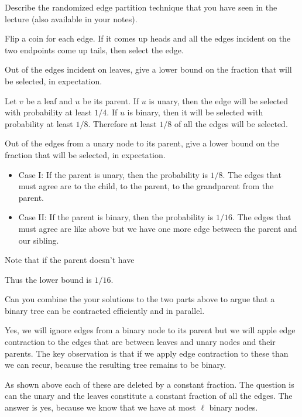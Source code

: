 \begin{problem}
\ask[2.]
Describe the randomized edge partition technique that you have seen in
the lecture (also available in your notes). 

\sol
Flip a coin for each edge. If it comes up heads and all the edges
incident on the two endpoints come up tails, then select the edge.


\ask[5.]
Out of the edges incident on leaves, give a lower bound on the
fraction that will be selected, in expectation.

\sol
Let $v$ be a leaf and $u$ be its parent. If $u$ is unary, then the
edge will be selected with probability at least $1/4$.  If $u$ is
binary, then it will be selected with probability at least $1/8$.
Therefore at least $1/8$ of all the edges will be selected.




\ask[5.]
Out of the edges from a unary node to its parent, give a lower bound
on the fraction that will be selected, in expectation.

\sol
\begin{itemize}
\item Case I: If the parent is unary, then the probability is $1/8$.
The edges that must agree are to the child, to the parent, to the
grandparent from the parent.
\item Case II: If the parent is binary, then the probability is
$1/16$. The edges that must agree are like above but we have one more
edge between the parent and our sibling.
\end{itemize}

Note that if the parent doesn't have 

Thus the lower bound is $1/16$.


\end{problem}

\begin{problem}
\ask
Can you combine the your solutions to the two parts above to argue
that a binary tree can be contracted efficiently and in parallel.

\sol
Yes, we will ignore edges from a binary node to its parent but we will
apple edge contraction to the edges that are between leaves and unary
nodes and their parents.  The key observation is that if we apply edge
contraction to these than we can recur, because the resulting
tree remains to be binary.

As shown above each of these are deleted by a constant fraction.  The
question is can the unary and the leaves constitute a constant
fraction of all the edges.  The answer is yes, because we know that we
have at most $\ell$ binary nodes.  
\end{problem}


